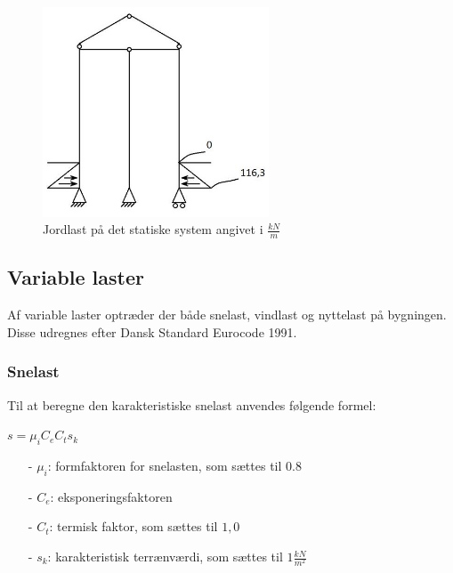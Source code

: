 \begin{figure}[htbp]
	\centering
	\includegraphics[width=0.6\textwidth]{billeder/jordlast.png}
	\caption{Jordlast på det statiske system angivet i $\frac{kN}{m}$}
	\label{fig:jordlast}
\end{figure}


\subsection{Variable laster}
Af variable laster optræder der både snelast, vindlast og nyttelast på bygningen. Disse udregnes efter Dansk Standard Eurocode 1991.

\subsubsection{Snelast}
Til at beregne den karakteristiske snelast anvendes følgende formel:
\begin{center}
	$s=\mu_iC_eC_ts_k$
\end{center}
\begin{itemize}
	\item[-] $\mu_i$: formfaktoren for snelasten, som sættes til 0.8 \citep[ tabel 5.2 kapitel 5.3]{EU91}
	\item[-] $C_e$: eksponeringsfaktoren
	\item[-] $C_t$: termisk faktor, som sættes til $1,\!0$ \citep[ kapitel 5.2]{EU91}
	\item[-] $s_k$: karakteristisk terrænværdi, som sættes til $1 \frac{kN}{m^2}$ \citep[ kapitel 4.1]{EU91}
\end{itemize}

